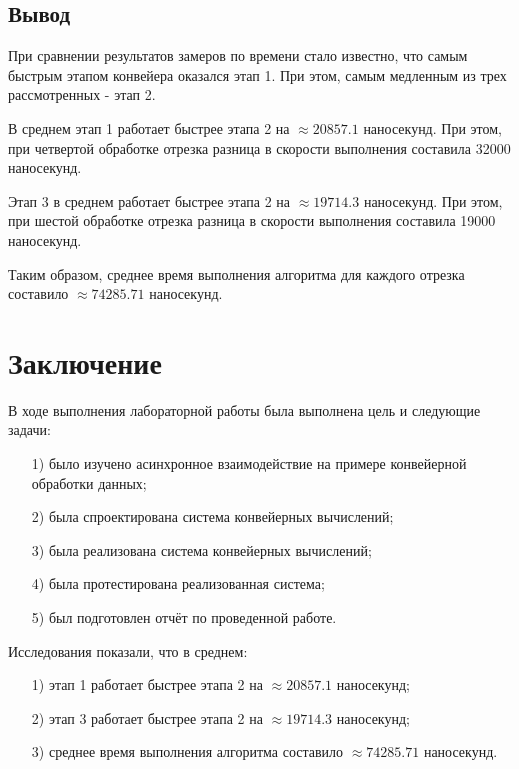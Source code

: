 \documentclass[12pt]{report}
\begin{document}
\newpage

\section*{Вывод}
При сравнении результатов замеров по времени стало известно, что самым быстрым этапом конвейера оказался этап 1. При этом, самым медленным из трех рассмотренных - этап 2.

В среднем этап 1 работает быстрее этапа 2 на $\approx 20857.1$ наносекунд. При этом, при четвертой обработке отрезка разница в скорости выполнения составила 32000 наносекунд.

Этап 3 в среднем работает быстрее этапа 2 на $\approx 19714.3$ наносекунд. При этом, при шестой обработке отрезка разница в скорости выполнения составила 19000 наносекунд.

Таким образом, среднее время выполнения алгоритма для каждого отрезка составило $\approx 74285.71$ наносекунд.

\chapter*{Заключение}
В ходе выполнения лабораторной работы была выполнена цель и следующие задачи:
\begin{enumerate}
\item[1)] было изучено асинхронное взаимодействие на примере конвейерной обработки данных;
\item[2)] была спроектирована система конвейерных вычислений;
\item[3)] была реализована система конвейерных вычислений;
\item[4)] была протестирована реализованная система;
\item[5)] был подготовлен отчёт по проведенной работе.
\end{enumerate}

Исследования показали, что в среднем:
\begin{enumerate}
\item[1)] этап 1 работает быстрее этапа 2 на $\approx 20857.1$ наносекунд;
\item[2)] этап 3 работает быстрее этапа 2 на $\approx 19714.3$ наносекунд;
\item[3)] среднее время выполнения алгоритма составило $\approx 74285.71$ наносекунд.
\end{enumerate}

\end{document}
